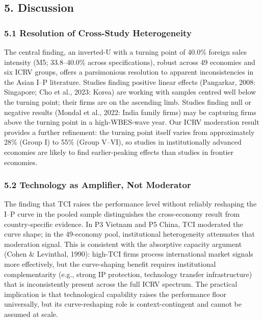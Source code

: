 \documentclass[
  12pt,a4paper]{article}
\begin{document}
\hypertarget{discussion}{%
\subsection{5. Discussion}\label{discussion}}

\hypertarget{resolution-of-cross-study-heterogeneity}{%
\subsubsection{5.1 Resolution of Cross-Study
Heterogeneity}\label{resolution-of-cross-study-heterogeneity}}

The central finding, an inverted-U with a turning point of 40.0\%
foreign sales intensity (M5; 33.8--40.0\% across specifications), robust
across 49 economies and six ICRV groups, offers a parsimonious
resolution to apparent inconsistencies in the Asian I--P literature.
Studies finding positive linear effects (Pangarkar, 2008: Singapore; Cho
et al., 2023: Korea) are working with samples centred well below the
turning point; their firms are on the ascending limb. Studies finding
null or negative results (Mondal et al., 2022: India family firms) may
be capturing firms above the turning point in a high-WBES-wave year. Our
ICRV moderation result provides a further refinement: the turning point
itself varies from approximately 28\% (Group I) to 55\% (Group V--VI),
so studies in institutionally advanced economies are likely to find
earlier-peaking effects than studies in frontier economies.

\hypertarget{technology-as-amplifier-not-moderator}{%
\subsubsection{5.2 Technology as Amplifier, Not
Moderator}\label{technology-as-amplifier-not-moderator}}

The finding that TCI raises the performance level without reliably
reshaping the I--P curve in the pooled sample distinguishes the
cross-economy result from country-specific evidence. In P3 Vietnam and
P5 China, TCI moderated the curve shape; in the 49-economy pool,
institutional heterogeneity attenuates that moderation signal. This is
consistent with the absorptive capacity argument (Cohen \& Levinthal,
1990): high-TCI firms process international market signals more
effectively, but the curve-shaping benefit requires institutional
complementarity (e.g., strong IP protection, technology transfer
infrastructure) that is inconsistently present across the full ICRV
spectrum. The practical implication is that technological capability
raises the performance floor universally, but its curve-reshaping role
is context-contingent and cannot be assumed at scale.
\end{document}
